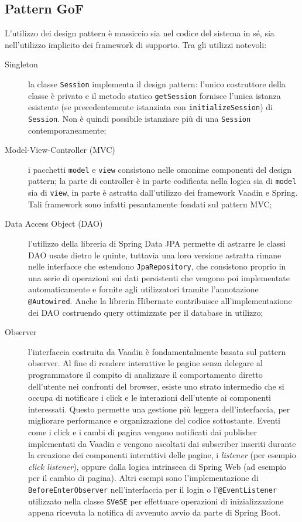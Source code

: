 \subsection{Pattern GoF}\label{GoF}
L'utilizzo dei design pattern è massiccio sia nel codice del sistema in sé, sia nell'utilizzo implicito dei framework di supporto. Tra gli utilizzi notevoli:
\begin{description}
	\item[Singleton] la classe \verb!Session! implementa il design pattern: l'unico costruttore della classe è privato e il metodo statico \verb!getSession! fornisce l'unica istanza esistente (se precedentemente istanziata con \verb!initializeSession!) di \verb!Session!. Non è quindi possibile istanziare più di una \verb!Session! contemporaneamente;
	\item[Model-View-Controller (MVC)] i pacchetti \verb!model! e \verb!view! consistono nelle omonime componenti del design pattern; la parte di controller è in parte codificata nella logica sia di \verb!model! sia di \verb!view!, in parte è astratta dall'utilizzo dei framework Vaadin e Spring. Tali framework sono infatti pesantamente fondati sul pattern MVC;
	\item[Data Access Object (DAO)] l'utilizzo della libreria di Spring Data JPA permette di astrarre le classi DAO usate dietro le quinte, tuttavia una loro versione astratta rimane nelle interfacce che estendono \verb!JpaRepository!, che consistono proprio in una serie di operazioni sui dati persistenti che vengono poi implementate automaticamente e fornite agli utilizzatori tramite l'annotazione \verb!@Autowired!. Anche la libreria Hibernate contribuisce all'implementazione dei DAO costruendo query ottimizzate per il database in utilizzo;
	\item[Observer] l'interfaccia costruita da Vaadin è fondamentalmente basata sul pattern observer. Al fine di rendere interattive le pagine senza delegare al programmatore il compito di analizzare il comportamento diretto dell'utente nei confronti del browser, esiste uno strato intermedio che si occupa di notificare i click e le interazioni dell'utente ai componenti interessati. Questo permette una gestione più leggera dell'interfaccia, per migliorare performance e organizzazione del codice sottostante. Eventi come i click e i cambi di pagina vengono notificati dai publisher implementati da Vaadin e vengono ascoltati dai subscriber inseriti durante la creazione dei componenti interattivi delle pagine, i \emph{listener} (per esempio \emph{click listener}), oppure dalla logica intrinseca di Spring Web (ad esempio per il cambio di pagina). Altri esempi sono l'implementazione di \verb!BeforeEnterObserver! nell'interfaccia per il login o l'\verb!@EventListener! utilizzato nella classe \verb!SVeSE! per effettuare operazioni di inizializzazione appena ricevuta la notifica di avvenuto avvio da parte di Spring Boot.

\end{description}
